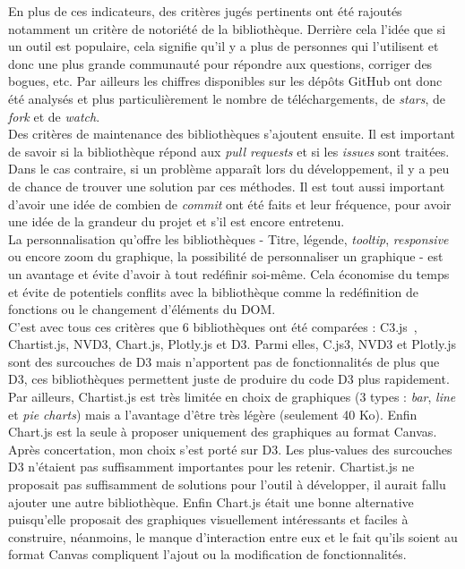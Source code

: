 En plus de ces indicateurs, des critères jugés pertinents ont été rajoutés notamment un critère de notoriété de la bibliothèque. Derrière cela l'idée que si un outil est populaire, cela signifie qu'il y a plus de personnes qui l'utilisent et donc une plus grande communauté pour répondre aux questions, corriger des bogues, etc. Par ailleurs les chiffres disponibles sur les dépôts GitHub ont donc été analysés et plus particulièrement le nombre de téléchargements, de \textit{stars}, de \textit{fork} et de \textit{watch}.\\

Des critères de maintenance des bibliothèques s'ajoutent ensuite. Il est important de savoir si la bibliothèque répond aux \textit{pull requests} et si les \textit{issues} sont traitées. Dans le cas contraire, si un problème apparaît lors du développement, il y a peu de chance de trouver une solution par ces méthodes. Il est tout aussi important d'avoir une idée de combien de \textit{commit} ont été faits et leur fréquence, pour avoir une idée de la grandeur du projet et s'il est encore entretenu.\\

La personnalisation qu'offre les bibliothèques - Titre, légende, \textit{tooltip}, \textit{responsive} ou encore zoom du graphique, la possibilité de personnaliser un graphique - est un avantage et évite d'avoir à tout redéfinir soi-même. Cela économise du temps et évite de potentiels conflits avec la bibliothèque comme la redéfinition de fonctions ou le changement d'éléments du DOM.\\

C'est avec tous ces critères que 6 bibliothèques ont été comparées : C3.js~\cite{c3}, Chartist.js, NVD3, Chart.js, Plotly.js et D3. Parmi elles, C.js3, NVD3 et Plotly.js sont des surcouches de D3 mais n'apportent pas de fonctionnalités de plus que D3, ces bibliothèques permettent juste de produire du code D3 plus rapidement. Par ailleurs, Chartist.js est très limitée en choix de graphiques (3 types : \textit{bar}, \textit{line} et \textit{pie} \textit{charts}) mais a l'avantage d'être très légère (seulement 40 Ko). Enfin Chart.js est la seule à proposer uniquement des graphiques au format Canvas.\\

Après concertation, mon choix s'est porté sur D3. Les plus-values des surcouches D3 n'étaient pas suffisamment importantes pour les retenir. Chartist.js ne proposait pas suffisamment de solutions pour l'outil à développer, il aurait fallu ajouter une autre bibliothèque. Enfin Chart.js était une bonne alternative puisqu'elle proposait des graphiques visuellement intéressants et faciles à construire, néanmoins, le manque d'interaction entre eux et le fait qu'ils soient au format Canvas compliquent l'ajout ou la modification de fonctionnalités.\\


